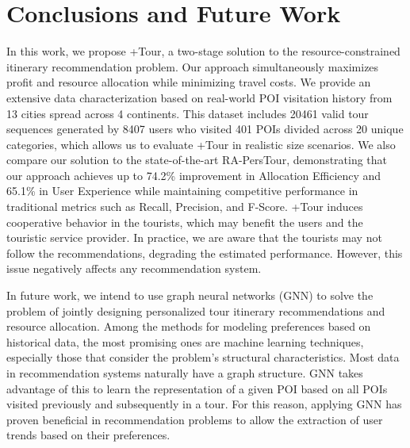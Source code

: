\section{Conclusions and Future Work}\label{sec:conclusions}

{In this work, we propose +Tour, a two-stage solution to the resource-constrained itinerary recommendation problem. Our approach simultaneously maximizes profit and resource allocation while minimizing travel costs. We provide an extensive data characterization based on real-world POI visitation history from 13 cities spread across 4 continents. This dataset includes 20461 valid tour sequences generated by 8407 users who visited 401 POIs divided across 20 unique categories, which allows us to evaluate +Tour in realistic size scenarios. We also compare our solution to the state-of-the-art RA-PersTour, demonstrating that our approach achieves up to 74.2\% improvement in Allocation Efficiency and 65.1\% in User Experience while maintaining competitive performance in traditional metrics such as Recall, Precision, and F-Score. +Tour induces cooperative behavior in the tourists, which may benefit the users and the touristic service provider. In practice, we are aware that the tourists may not follow the recommendations, degrading the estimated performance. However, this issue negatively affects any recommendation system.} 

{In future work, we intend to use graph neural networks (GNN) to solve the problem of jointly designing personalized tour itinerary recommendations and resource allocation.
Among the methods for modeling preferences based on historical data, the most promising ones are machine learning techniques, especially those that consider the problem's structural characteristics. Most data in recommendation systems naturally have a graph structure. GNN takes advantage of this to learn the representation of a given POI based on all POIs visited previously and subsequently in a tour. For this reason, applying GNN has proven beneficial in recommendation problems to allow the extraction of user trends based on their preferences.}

